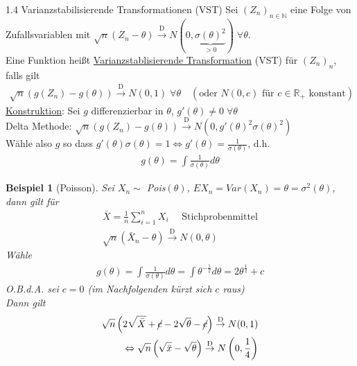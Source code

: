\documentclass[a4paper,openany]{book}
\theoremstyle{mytheoremstyle}
\newtheorem*{bei}{Beispiel}
\theoremstyle{mytheoremstyle2}
\begin{document}
\begin{defi}{1.4 Varianzstabilisierende Transformationen (VST)}{}
  Sei $(Z_n)_{n \in \mathbb{N}}$ eine Folge von Zufallsvariablen mit $\sqrt{n}(Z_n-\theta)\overset{\text{D}}\to N(0,\underbrace{\sigma(\theta) ^2}_{>0})\; \forall\theta$. \\
  Eine Funktion heißt \underline{Varianzstablisierende Transformation} (VST) für $(Z_n)_n$, falls gilt
  \begin{align*}
    \sqrt{n}(g(Z_n)-g(\theta))\overset{\text{D}}\to N(0,1)\;\forall \theta \quad (\text{oder } N(0,c) \text{ für } c \in \mathbb{R}_+ \text{ konstant})
  \end{align*}
  \underline{Konstruktion}: Sei $g$ differenzierbar in $\theta$, $g'(\theta) \neq 0\; \forall \theta$ \\
  Delta Methode: $\sqrt{n}(g(Z_n)-g(\theta))\overset{\text{D}}\to N(0,g'(\theta)^2 \sigma(\theta) ^2)$  \\
  Wähle also $g$ so dass $g'(\theta)\sigma (\theta)=1 \Leftrightarrow g'(\theta)=\frac{1}{\sigma (\theta)}$, d.h.
  \begin{align*}
    g(\theta)=\int{\frac{1}{\sigma (\theta)}d \theta}
  \end{align*}
\end{defi}
\begin{bei}[Poisson]
  Sei $X_n\sim $ Pois$(\theta)$, $EX_n=Var(X_n)=\theta=\sigma ^2(\theta)$, dann gilt für 
  \begin{align*}
    \bar{X}=\frac{1}{n}\sum_{i=1}^{n}{X_i}\quad \text{ Stichprobenmittel}\\
    \sqrt{n}(\bar{X}_n-\theta)\overset{\text{D}}\to N(0,\theta)
  \end{align*}
  Wähle
  \begin{align*}
    g(\theta)=\int{\frac{1}{\sigma (\theta)}d \theta}=\int{\theta^{-\frac{1}{2}}d \theta}=2 \theta^{\frac{1}{2}}+c
  \end{align*}
  O.B.d.A. sei $c=0$ (im Nachfolgenden kürzt sich $c$ raus)\\
  Dann gilt
  \begin{align*}
    \sqrt{n}\left( 2 \sqrt{\bar{X}}+\cancel{c}-2\sqrt{\theta}-\cancel{c} \right)\overset{\text{D}}\to N(0,1)\\
    \Leftrightarrow \sqrt{n}\left( \sqrt{\bar{x}}-\sqrt{\theta} \right)\overset{\text{D}}\to N \left(0,\frac{1}{4}\right)
  \end{align*}
\end{bei}
\end{document}
